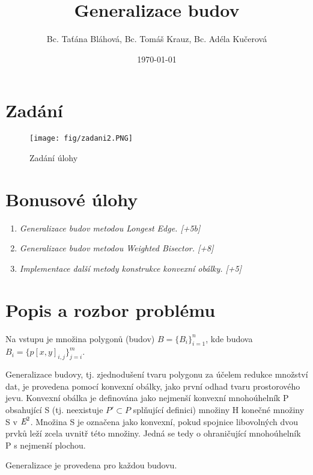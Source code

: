 \documentclass[oneside,12pt,a4paper]{book}
\title{Generalizace budov}
\author{Bc. Taťána Bláhová, Bc. Tomáš Krauz, Bc. Adéla Kučerová}
\date{\today} %
\begin{document}
\maketitle

    \vspace{-2cm}
    \vfill
    \begingroup
    
    \tableofcontents
    \vspace{-0.5cm}
    \printglossary[type=\acronymtype,title=\Large Acronyms]
    \endgroup
    \vspace{-1cm}
% 


\clearpage
\chapter{Zadání}

\begin{figure}[ht!]
    \centering
    \texttt{[image: fig/zadani2.PNG]}
    \caption{Zadání úlohy}
    \label{fig:Zadání úlohy}
\end{figure}



\chapter{Bonusové úlohy} 
\begin{enumerate}
    \item \emph{Generalizace budov metodou Longest Edge.    [+5b]}
    \item \emph{Generalizace budov metodou Weighted Bisector.   [+8]}
    \item \emph{Implementace další metody konstrukce konvexní obálky.   [+5]}
\end{enumerate}


\chapter{Popis a rozbor problému} 
Na vstupu je množina polygonů (budov) $B = \{B_i\}_{i=1}^n$, kde budova $B_i  = \{p[x,y]_{i,j}\}_{j=i}^m$.\par
Generalizace budovy, tj. zjednodušení tvaru polygonu za účelem redukce množství dat, je provedena pomocí konvexní obálky, jako první odhad tvaru prostorového jevu. Konvexní obálka je definována jako nejmenší konvexní mnohoúhelník P obsahující S (tj. neexistuje $P' \subset P$ splňující definici) množiny H konečné množiny S v $\emph{E}^2$. Množina S je označena jako konvexní, pokud spojnice libovolných dvou prvků leží zcela uvnitř této množiny. Jedná se tedy o ohraničující mnohoúhelník P s nejmenší plochou.\par
Generalizace je provedena pro každou budovu.\par
\end{document}
